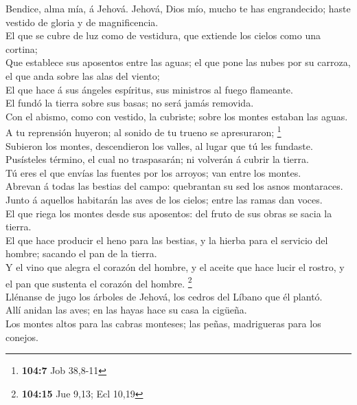  Bendice, alma mía, á Jehová. Jehová, Dios mío, mucho te has
engrandecido; haste vestido de gloria y de magnificencia.\\
 El que se cubre de luz como de vestidura, que extiende los
cielos como una cortina;\\
 Que establece sus aposentos entre las aguas; el que pone
las nubes por su carroza, el que anda sobre las alas del viento;\\
 El que hace á sus ángeles espíritus, sus ministros al fuego
flameante.\\
 El fundó la tierra sobre sus basas; no será jamás
removida.\\
 Con el abismo, como con vestido, la cubriste; sobre los
montes estaban las aguas.\\
 A tu reprensión huyeron; al sonido de tu trueno se
apresuraron; \footnote{\textbf{104:7} Job 38,8-11}\\
 Subieron los montes, descendieron los valles, al lugar que
tú les fundaste.\\
 Pusísteles término, el cual no traspasarán; ni volverán á
cubrir la tierra.\\
 Tú eres el que envías las fuentes por los arroyos; van
entre los montes.\\
 Abrevan á todas las bestias del campo: quebrantan su sed
los asnos montaraces.\\
 Junto á aquellos habitarán las aves de los cielos; entre
las ramas dan voces.\\
 El que riega los montes desde sus aposentos: del fruto de
sus obras se sacia la tierra.\\
 El que hace producir el heno para las bestias, y la hierba
para el servicio del hombre; sacando el pan de la tierra.\\
 Y el vino que alegra el corazón del hombre, y el aceite
que hace lucir el rostro, y el pan que sustenta el corazón del hombre.
\footnote{\textbf{104:15} Jue 9,13; Ecl 10,19}\\
 Llénanse de jugo los árboles de Jehová, los cedros del
Líbano que él plantó.\\
 Allí anidan las aves; en las hayas hace su casa la
cigüeña.\\
 Los montes altos para las cabras monteses; las peñas,
madrigueras para los conejos.\\
